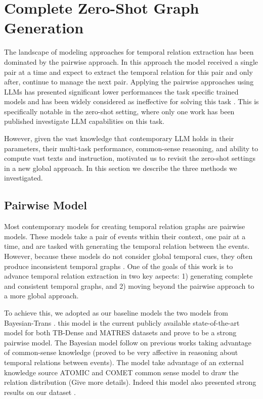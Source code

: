 \section{Complete Zero-Shot Graph Generation}
\label{section:model}
The landscape of modeling approaches for temporal relation extraction has been dominated by the pairwise approach. In this approach the model received a single pair at a time and expect to extract the temporal relation for this pair and only after, continue to manage the next pair. Applying the pairwise approaches using LLMs has presented significant lower performances the task specific trained models and has been widely considered as ineffective for solving this task . This is specifically notable in the zero-shot setting, where only one work has been published investigate LLM capabilities on this task.

However, given the vast knowledge that contemporary LLM holds in their parameters, their multi-task performance, common-sense reasoning, and ability to compute vast texts and instruction, motivated us to revisit the zero-shot settings in a new global approach. In this section we describe the three methods we investigated.


\subsection{Pairwise Model}
Most contemporary models for creating temporal relation graphs are pairwise models. These models take a pair of events within their context, one pair at a time, and are tasked with generating the temporal relation between the events. However, because these models do not consider global temporal cues, they often produce inconsistent temporal graphs \cite{ning-etal-2018-joint, wang-etal-2020-joint, alsayyahi-batista-navarro-2023-timeline}. One of the goals of this work is to advance temporal relation extraction in two key aspects: 1) generating complete and consistent temporal graphs, and 2) moving beyond the pairwise approach to a more global approach. 

To achieve this, we adopted as our baseline models the two models from Bayesian-Trans \cite{tan-etal-2023-event}. this model is the current publicly available state-of-the-art model for both TB-Dense and MATRES datasets and prove to be a strong pairwise model. The Bayesian model follow on previous works \cite{wang-etal-2020-joint, niu-etal-2024-contempo} taking advantage of common-sense knowledge (proved to be very affective in reasoning about temporal relations between events). The model take advantage of an external knowledge source ATOMIC and COMET common sense model \cite{Hwang2020COMETATOMIC2O} to draw the relation distribution (Give more details). Indeed this model also presented strong results on our \App{} dataset .


